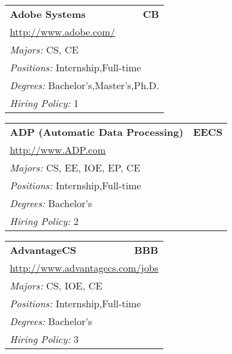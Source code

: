 \documentclass[twoside]{article}
\begin{document}
\begin{center}
\begin{multicols}{3}
\begin{FlushLeft}
\begin{minipage}{\columnwidth}
\end{minipage}
 
\begin{minipage}{\columnwidth}\begin{tabularx}{.95\columnwidth}{Xr}
                 {\Large\bf Adobe Systems} & {\Large\bf CB}\\
    \multicolumn{2}{p{.95\columnwidth}}{\url{http://www.adobe.com/}}\\
    \multicolumn{2}{p{.95\columnwidth}}{\emph{Majors:} CS, CE}\\
    \multicolumn{2}{p{.95\columnwidth}}{\emph{Positions:} Internship,Full-time}\\
    \multicolumn{2}{p{.95\columnwidth}}{\emph{Degrees:} Bachelor's,Master's,Ph.D.}\\
    \multicolumn{2}{p{.95\columnwidth}}{\emph{Hiring Policy:} 1}\\
    \end{tabularx}
    
\end{minipage}
 
\begin{minipage}{\columnwidth}\begin{tabularx}{.95\columnwidth}{Xr}
                 {\Large\bf ADP (Automatic Data Processing)} & {\Large\bf EECS}\\
    \multicolumn{2}{p{.95\columnwidth}}{\url{http://www.ADP.com}}\\
    \multicolumn{2}{p{.95\columnwidth}}{\emph{Majors:} CS, EE, IOE, EP, CE}\\
    \multicolumn{2}{p{.95\columnwidth}}{\emph{Positions:} Internship,Full-time}\\
    \multicolumn{2}{p{.95\columnwidth}}{\emph{Degrees:} Bachelor's}\\
    \multicolumn{2}{p{.95\columnwidth}}{\emph{Hiring Policy:} 2}\\
    \end{tabularx}
    
\end{minipage}
 
\begin{minipage}{\columnwidth}\begin{tabularx}{.95\columnwidth}{Xr}
                 {\Large\bf AdvantageCS} & {\Large\bf BBB}\\
    \multicolumn{2}{p{.95\columnwidth}}{\url{http://www.advantagecs.com/jobs}}\\
    \multicolumn{2}{p{.95\columnwidth}}{\emph{Majors:} CS, IOE, CE}\\
    \multicolumn{2}{p{.95\columnwidth}}{\emph{Positions:} Internship,Full-time}\\
    \multicolumn{2}{p{.95\columnwidth}}{\emph{Degrees:} Bachelor's}\\
    \multicolumn{2}{p{.95\columnwidth}}{\emph{Hiring Policy:} 3}\\
    \end{tabularx}
    

\end{minipage}
\end{FlushLeft}
\end{multicols}
\end{center}
\end{document}
